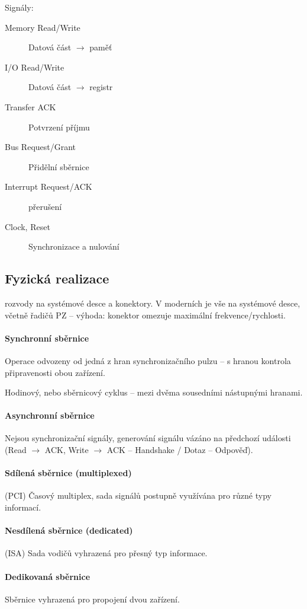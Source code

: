 \documentclass[a4paper, 11pt]{report}
\begin{document}
Signály:
\begin{description}
	\item[Memory Read/Write] Datová část $\to$ paměť
	\item[I/O Read/Write] Datová část $\to$ registr
	\item[Transfer ACK] Potvrzení příjmu
	\item[Bus Request/Grant] Přidělní sběrnice
	\item[Interrupt Request/ACK] přerušení
	\item[Clock, Reset] Synchronizace a nulování
\end{description}

\subsection{Fyzická realizace} rozvody na systémové desce a konektory. V moderních je vše na systémové desce, včetně řadičů PZ -- výhoda: konektor omezuje maximální frekvence/rychlosti.

\paragraph{Synchronní sběrnice}
Operace odvozeny od jedná z hran synchronizačního pulzu -- s hranou kontrola připravenosti obou zařízení.

Hodinový, nebo sběrnicový cyklus -- mezi dvěma sousedními nástupnými hranami.

\paragraph{Asynchronní sběrnice}
Nejsou synchronizační signály, generování signálu vázáno na předchozí události (Read $\to$ ACK, Write $\to$ ACK -- Handshake / Dotaz -- Odpověď).

\paragraph{Sdílená sběrnice (multiplexed)} (PCI)
Časový multiplex, sada signálů postupně využívána pro různé typy informací.

\paragraph{Nesdílená sběrnice (dedicated)} (ISA)
Sada vodičů vyhrazená pro přesný typ informace.

\paragraph{Dedikovaná sběrnice}
Sběrnice vyhrazená pro propojení dvou zařízení.
\end{document}
